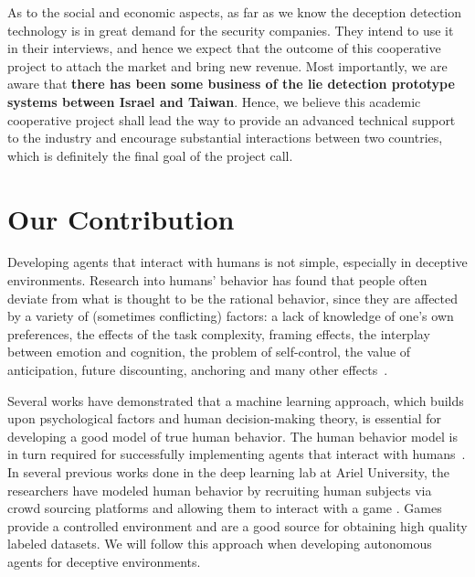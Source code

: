 As to the social and economic aspects, as far as we know the deception detection technology is in great demand for the security companies. They intend to use it in their interviews, and hence we expect that the outcome of this cooperative project to attach the market and bring new revenue. Most importantly, we are aware that \textbf{there has been some business of the lie detection prototype systems between Israel and Taiwan}. Hence, we believe this academic cooperative project shall lead the way to provide an advanced technical support to the industry and encourage substantial interactions between two countries, which is definitely the final goal of the project call. 

\section {Our Contribution}

Developing agents that interact with humans is not simple, especially in deceptive environments. Research into humans' behavior has found that people often deviate from what is thought to be the rational behavior, since they are affected by a variety of (sometimes conflicting) factors: a lack of knowledge of one's own preferences, the effects of the task complexity, framing effects, the interplay between emotion and cognition, the problem of self-control, the value of anticipation, future discounting, anchoring and many other effects~\cite{tversky81,Loewenstein00,ArielyAnchor,camerer03}.

Several works have demonstrated that a machine learning approach, which builds upon psychological factors and human decision-making theory, is essential for developing a good model of true human behavior. The human behavior model is in turn required for successfully implementing agents that interact with humans~\cite{galPfe07,hindriks2008opponent,subrahmanian2000heterogeneous,RosenfeldK-aamas11}. In several previous works done in the deep learning lab at Ariel University, the researchers have modeled human behavior by recruiting human subjects via crowd sourcing platforms and allowing them to interact with a game \cite{AzariaRKGG12,AzariaRKGT12,azaria2015agent,nguyen2013analyzing}. Games provide a controlled environment and are a good source for obtaining high quality labeled datasets.
We will follow this approach when developing autonomous agents for deceptive environments.


